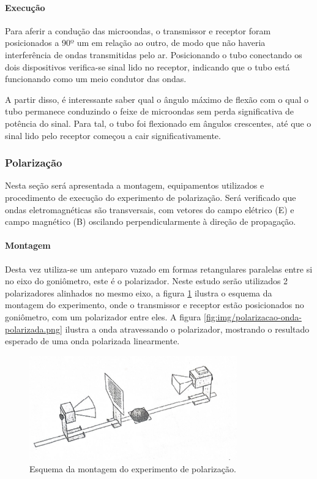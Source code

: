 \documentclass[12pt]{article}
\begin{document}
\paragraph{Execução}
Para aferir a condução das microondas, o transmissor e receptor foram
posicionados a 90º um em relação ao outro, de modo que não haveria
interferência de ondas transmitidas pelo ar. Posicionando o tubo
conectando os dois dispositivos verifica-se sinal lido no receptor,
indicando que o tubo está funcionando como um meio condutor das ondas.

A partir disso, é interessante saber qual o ângulo máximo de flexão
com o qual o tubo permanece conduzindo o feixe de microondas sem
perda significativa de potência do sinal. Para tal, o tubo foi
flexionado em ângulos crescentes, até que o sinal lido pelo receptor
começou a cair significativamente.

\subsubsection{Polarização}
Nesta seção será apresentada a montagem, equipamentos utilizados e
procedimento de execução do experimento de polarização. Será
verificado que ondas eletromagnéticas são transversais, com vetores
do campo elétrico (E) e campo magnético (B) oscilando
perpendicularmente à direção de propagação.

\paragraph{Montagem}
Desta vez utiliza-se um anteparo vazado em formas retangulares
paralelas entre si no eixo do goniômetro, este é o polarizador. Neste
estudo serão utilizados 2 polarizadores alinhados no mesmo eixo, a figura
\ref{fig:img/polarizacao-esquema.png} ilustra o esquema da montagem do
experimento, onde o transmissor e receptor estão posicionados no
goniômetro, com um polarizador entre eles. A figura
\ref{fig:img/polarizacao-onda-polarizada.png} ilustra a onda
atravessando o polarizador, mostrando o resultado esperado de uma onda
polarizada linearmente.

\begin{figure}[H]
  \centering
  \includegraphics[width=0.8\textwidth]{img/polarizacao-esquema.png}
  \caption{Esquema da montagem do experimento de polarização.}
  \label{fig:img/polarizacao-esquema.png}
\end{figure}
\end{document}

